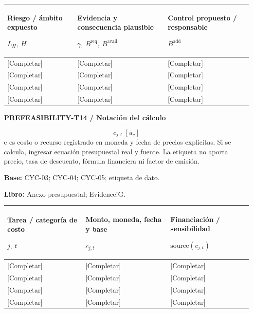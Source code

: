 {\sffamily\fontsize{8.3}{10.3}\selectfont\begin{longtable}{@{}P{51.14mm} P{56.09mm} P{57.74mm}@{}}
\toprule
\textbf{Riesgo / ámbito expuesto}\par {\normalfont\fontsize{8.2}{10}\selectfont $L_H,\ H$} & \textbf{Evidencia y consecuencia plausible}\par {\normalfont\fontsize{8.2}{10}\selectfont $\gamma,\ B^{\mathrm{req}},\ B^{\mathrm{avail}}$} & \textbf{Control propuesto / responsable}\par {\normalfont\fontsize{8.2}{10}\selectfont $B^{\mathrm{add}}$}\\\midrule\endhead
\rule{0pt}{7.7mm}[Completar] & [Completar] & [Completar]\\\hline
\rule{0pt}{7.7mm}[Completar] & [Completar] & [Completar]\\\hline
\rule{0pt}{7.7mm}[Completar] & [Completar] & [Completar]\\\hline
\rule{0pt}{7.7mm}[Completar] & [Completar] & [Completar]\\\hline
\end{longtable}}
\par\begingroup\sffamily\fontsize{8}{10}\selectfont\color{NEBGreen}\setlength{\parskip}{2pt}\setlength{\abovedisplayskip}{4pt}\setlength{\belowdisplayskip}{4pt}\setlength{\abovedisplayshortskip}{2pt}\setlength{\belowdisplayshortskip}{3pt}
\textbf{PREFEASIBILITY-T14 / Notación del cálculo}\par
{\fontsize{9}{11}\selectfont\[ c_{j,t}\;[u_c] \]}
c es costo o recurso registrado en moneda y fecha de precios explícitas. Si se calcula, ingresar ecuación presupuestal real y fuente. La etiqueta no aporta precio, tasa de descuento, fórmula financiera ni factor de emisión.\par
\textbf{Base:} CYC-03; CYC-04; CYC-05; etiqueta de dato.\par
\textbf{Libro:} Anexo presupuestal; Evidence!G.\par\endgroup
{\sffamily\fontsize{8.3}{10.3}\selectfont\begin{longtable}{@{}P{49.49mm} P{64.34mm} P{51.14mm}@{}}
\toprule
\textbf{Tarea / categoría de costo}\par {\normalfont\fontsize{8.2}{10}\selectfont $j,\ t$} & \textbf{Monto, moneda, fecha y base}\par {\normalfont\fontsize{8.2}{10}\selectfont $c_{j,t}$} & \textbf{Financiación / sensibilidad}\par {\normalfont\fontsize{8.2}{10}\selectfont $\text{source}(c_{j,t})$}\\\midrule\endhead
\rule{0pt}{7.7mm}[Completar] & [Completar] & [Completar]\\\hline
\rule{0pt}{7.7mm}[Completar] & [Completar] & [Completar]\\\hline
\rule{0pt}{7.7mm}[Completar] & [Completar] & [Completar]\\\hline
\rule{0pt}{7.7mm}[Completar] & [Completar] & [Completar]\\\hline
\end{longtable}}
